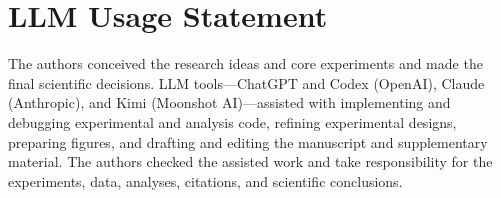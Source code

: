 \section*{LLM Usage Statement}
The authors conceived the research ideas and core experiments and made the final scientific decisions. LLM tools---ChatGPT and Codex (OpenAI), Claude (Anthropic), and Kimi (Moonshot AI)---assisted with implementing and debugging experimental and analysis code, refining experimental designs, preparing figures, and drafting and editing the manuscript and supplementary material. The authors checked the assisted work and take responsibility for the experiments, data, analyses, citations, and scientific conclusions.
